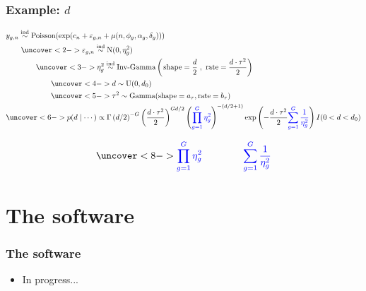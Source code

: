 \documentclass[handout]{beamer}
\providecommand{\e}{\varepsilon}
\numberwithin{equation}{section}
\begin{document}
\begin{frame}
\frametitle{Example: $d$} \tiny
\begin{align*}
&y_{g,n} \stackrel{\text{ind}}{\sim} \text{Poisson}( \exp(c_n + \e_{g, n} + \mu(n, \phi_g, \alpha_g, \delta_g))) \\
& \qquad \uncover<2->{ \e_{g, n} \stackrel{\text{ind}}{\sim} \text{N}( 0, \eta_g^2)} \\
& \qquad \qquad \uncover<3->{\eta_g^2 \stackrel{\text{ind}}{\sim} \text{Inv-Gamma}\left (\left . \text{shape} = \frac{d}{2} \right ., \ \text{rate} =  \frac{d \cdot \tau^2}{2} \right)} \\
& \qquad \qquad \qquad \uncover<4->{d \stackrel{\text{}}{\sim} \text{U}( 0, d_0)} \\
& \qquad \qquad \qquad \uncover<5->{\tau^2 \stackrel{\text{}}{\sim} \text{Gamma}(\text{shape} = a_\tau, \text{rate} = b_\tau)} \\
&\uncover<6->{p(d \mid \cdots) \propto \Gamma \left( d/2 \right )^{-G} \left ( \frac{d \cdot \tau^2}{2}\right ) ^ { G d  /2 } \left ({\color{blue} \prod_{g = 1}^G { \eta_g^2} } \right )^{ -(d/2 + 1)} \exp \left (- \frac{d \cdot \tau^2}{2} {\color{blue} \sum_{g = 1}^G \frac{1}{ \eta_g^2} }\right ) I(0 < d < d_0) }
\end{align*}



\small
\begin{itemize}
\begin{align*}
\uncover<8->{\color{blue}\prod_{g = 1}^G \eta_g^2 \qquad \qquad \sum_{g = 1}^G \frac{1}{\eta_g^2} } 
\end{align*}
\end{itemize}
\end{frame}






\section{The software}

\setcounter{subsection}{1}


\begin{frame}
\frametitle{The software}
\begin{itemize}
\item In progress...
\end{itemize}
\end{frame}
\end{document}
